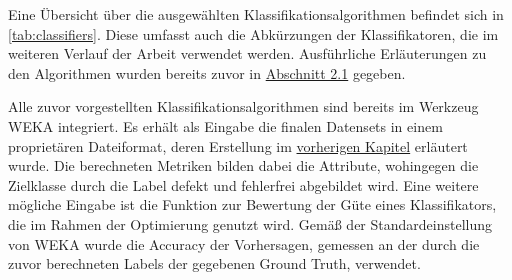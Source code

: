 Eine Übersicht über die ausgewählten Klassifikationsalgorithmen befindet sich in \autoref{tab:classifiers}. Diese umfasst auch die Abkürzungen der Klassifikatoren, die im weiteren Verlauf der Arbeit verwendet werden. Ausführliche Erläuterungen zu den Algorithmen wurden bereits zuvor in \hyperref[algorithms]{Abschnitt 2.1} gegeben.

\begin{table}[ht]
\centering
\caption{Zum Training verwendete Klassifikationsalgorithmen}
\label{tab:classifiers}
\end{table}

Alle zuvor vorgestellten Klassifikationsalgorithmen sind bereits im Werkzeug WEKA integriert. Es erhält als Eingabe die finalen Datensets in einem proprietären Dateiformat, deren Erstellung im \hyperref[dataset-creation]{vorherigen Kapitel} erläutert wurde. Die berechneten Metriken bilden dabei die Attribute, wohingegen die Zielklasse durch die Label \glqq defekt\grqq{} und \glqq fehlerfrei\grqq{} abgebildet wird. Eine weitere mögliche Eingabe ist die Funktion zur Bewertung der Güte eines Klassifikators, die im Rahmen der Optimierung genutzt wird. Gemäß der Standardeinstellung von WEKA wurde die Accuracy der Vorhersagen, gemessen an der durch die zuvor berechneten Labels der gegebenen \glqq Ground Truth\grqq{}, verwendet.

